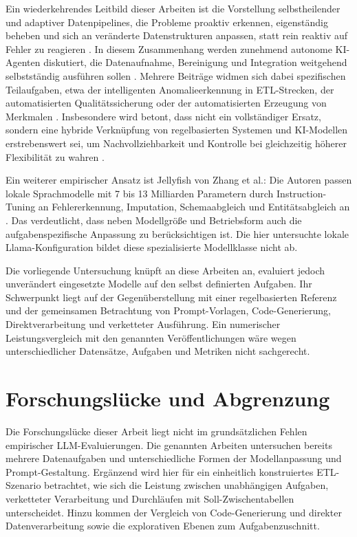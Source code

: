 Ein wiederkehrendes Leitbild dieser Arbeiten ist die Vorstellung selbstheilender und adaptiver Datenpipelines, die Probleme proaktiv erkennen, eigenständig beheben und sich an veränderte Datenstrukturen anpassen, statt rein reaktiv auf Fehler zu reagieren \autocite{chakrabortyETLHowAI2025,reddyAIDrivenDataIntegration2025}. In diesem Zusammenhang werden zunehmend autonome \ac{KI}-Agenten diskutiert, die Datenaufnahme, Bereinigung und Integration weitgehend selbstständig ausführen sollen \autocite{maddaliAutonomousAIAgents2023,chakrabortyETLHowAI2025}. Mehrere Beiträge widmen sich dabei spezifischen Teilaufgaben, etwa der intelligenten Anomalieerkennung in \ac{ETL}-Strecken, der automatisierten Qualitätssicherung oder der automatisierten Erzeugung von Merkmalen \autocite{khanIntelligentAnomalyDetection2025,maddaliAutomatingDataQuality}. Insbesondere wird betont, dass nicht ein vollständiger Ersatz, sondern eine hybride Verknüpfung von regelbasierten Systemen und \ac{KI}-Modellen erstrebenswert sei, um Nachvollziehbarkeit und Kontrolle bei gleichzeitig höherer Flexibilität zu wahren \autocite{walhaDataIntegrationTraditional2024,kasireddyRoleAIModern2026}.

Ein weiterer empirischer Ansatz ist Jellyfish von Zhang et al.: Die Autoren passen lokale Sprachmodelle mit 7 bis 13 Milliarden Parametern durch Instruction-Tuning an Fehlererkennung, Imputation, Schemaabgleich und Entitätsabgleich an \autocite{zhangJellyfish2024}. Das verdeutlicht, dass neben Modellgröße und Betriebsform auch die aufgabenspezifische Anpassung zu berücksichtigen ist. Die hier untersuchte lokale Llama-Konfiguration bildet diese spezialisierte Modellklasse nicht ab.

Die vorliegende Untersuchung knüpft an diese Arbeiten an, evaluiert jedoch unverändert eingesetzte Modelle auf den selbst definierten Aufgaben. Ihr Schwerpunkt liegt auf der Gegenüberstellung mit einer regelbasierten Referenz und der gemeinsamen Betrachtung von Prompt-Vorlagen, Code-Generierung, Direktverarbeitung und verketteter Ausführung. Ein numerischer Leistungsvergleich mit den genannten Veröffentlichungen wäre wegen unterschiedlicher Datensätze, Aufgaben und Metriken nicht sachgerecht.

\section{Forschungslücke und Abgrenzung}
\label{sec:forschungsluecke}

Die Forschungslücke dieser Arbeit liegt nicht im grundsätzlichen Fehlen empirischer LLM-Evaluierungen. Die genannten Arbeiten untersuchen bereits mehrere Datenaufgaben und unterschiedliche Formen der Modellanpassung und Prompt-Gestaltung. Ergänzend wird hier für ein einheitlich konstruiertes \ac{ETL}-Szenario betrachtet, wie sich die Leistung zwischen unabhängigen Aufgaben, verketteter Verarbeitung und Durchläufen mit Soll-Zwischentabellen unterscheidet. Hinzu kommen der Vergleich von Code-Generierung und direkter Datenverarbeitung sowie die explorativen Ebenen zum Aufgabenzuschnitt.

